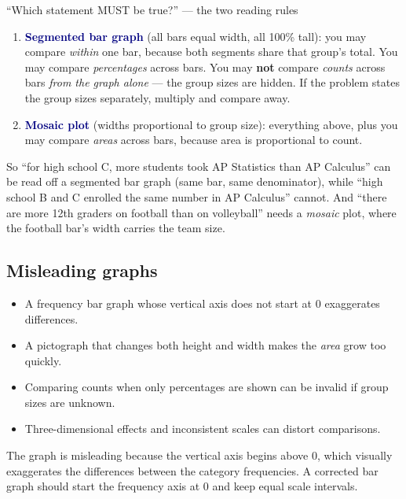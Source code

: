 \documentclass[11pt]{article}
\newcommand{\key}[1]{\textbf{\textcolor{Navy}{#1}}}
\newcommand{\ans}[1]{\textcolor{AnswerBlue}{#1}}
\begin{document}
\begin{bigidea}{``Which statement MUST be true?'' --- the two reading rules}
\begin{enumerate}[label=\arabic*.]
  \item \key{Segmented bar graph} (all bars equal width, all 100\% tall): you may compare \emph{within} one bar, because both segments share that group's total. You may compare \emph{percentages} across bars. You may \textbf{not} compare \emph{counts} across bars \emph{from the graph alone} --- the group sizes are hidden. If the problem states the group sizes separately, multiply and compare away.
  \item \key{Mosaic plot} (widths proportional to group size): everything above, plus you may compare \emph{areas} across bars, because area is proportional to count.
\end{enumerate}
So ``for high school C, more students took AP Statistics than AP Calculus'' can be read off a segmented bar graph (same bar, same denominator), while ``high school B and C enrolled the same number in AP Calculus'' cannot. And ``there are more 12th graders on football than on volleyball'' needs a \emph{mosaic} plot, where the football bar's width carries the team size.
\end{bigidea}

\subsection{Misleading graphs}
\begin{itemize}
  \item A frequency bar graph whose vertical axis does not start at 0 exaggerates differences.
  \item A pictograph that changes both height and width makes the \emph{area} grow too quickly.
  \item Comparing counts when only percentages are shown can be invalid if group sizes are unknown.
  \item Three-dimensional effects and inconsistent scales can distort comparisons.
\end{itemize}

\begin{answerbox}
The graph is misleading because \ans{the vertical axis begins above 0}, which \ans{visually exaggerates the differences between the category frequencies}. A corrected bar graph should \ans{start the frequency axis at 0 and keep equal scale intervals}.
\end{answerbox}
\end{document}
